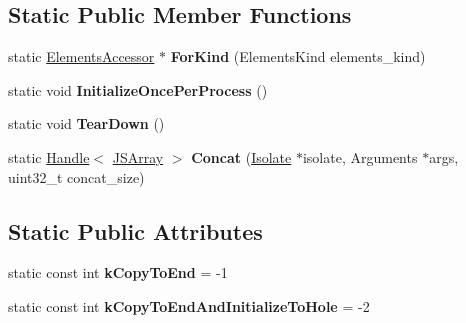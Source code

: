 \subsection*{Static Public Member Functions}
\begin{DoxyCompactItemize}
\item 
static \hyperlink{classv8_1_1internal_1_1_elements_accessor}{Elements\+Accessor} $\ast$ {\bfseries For\+Kind} (Elements\+Kind elements\+\_\+kind)\hypertarget{classv8_1_1internal_1_1_elements_accessor_af880d16ed39d123746b68f9510956872}{}\label{classv8_1_1internal_1_1_elements_accessor_af880d16ed39d123746b68f9510956872}

\item 
static void {\bfseries Initialize\+Once\+Per\+Process} ()\hypertarget{classv8_1_1internal_1_1_elements_accessor_a7d9e3760dd5aad13d53c3ad1e15a8cad}{}\label{classv8_1_1internal_1_1_elements_accessor_a7d9e3760dd5aad13d53c3ad1e15a8cad}

\item 
static void {\bfseries Tear\+Down} ()\hypertarget{classv8_1_1internal_1_1_elements_accessor_acf8472f5ad7353960fa3564b575231c2}{}\label{classv8_1_1internal_1_1_elements_accessor_acf8472f5ad7353960fa3564b575231c2}

\item 
static \hyperlink{classv8_1_1internal_1_1_handle}{Handle}$<$ \hyperlink{classv8_1_1internal_1_1_j_s_array}{J\+S\+Array} $>$ {\bfseries Concat} (\hyperlink{classv8_1_1internal_1_1_isolate}{Isolate} $\ast$isolate, Arguments $\ast$args, uint32\+\_\+t concat\+\_\+size)\hypertarget{classv8_1_1internal_1_1_elements_accessor_adcf664c98ad19f1c9d51aa62fb0e30e6}{}\label{classv8_1_1internal_1_1_elements_accessor_adcf664c98ad19f1c9d51aa62fb0e30e6}

\end{DoxyCompactItemize}
\subsection*{Static Public Attributes}
\begin{DoxyCompactItemize}
\item 
static const int {\bfseries k\+Copy\+To\+End} = -\/1\hypertarget{classv8_1_1internal_1_1_elements_accessor_a8f8b80e6b69040c509a1ce7774ee48b1}{}\label{classv8_1_1internal_1_1_elements_accessor_a8f8b80e6b69040c509a1ce7774ee48b1}

\item 
static const int {\bfseries k\+Copy\+To\+End\+And\+Initialize\+To\+Hole} = -\/2\hypertarget{classv8_1_1internal_1_1_elements_accessor_a323719573cd6be900ebf66af3244cc97}{}\label{classv8_1_1internal_1_1_elements_accessor_a323719573cd6be900ebf66af3244cc97}

\end{DoxyCompactItemize}

